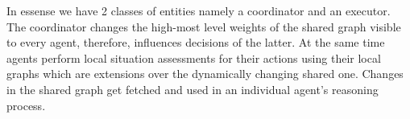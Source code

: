 In essense we have 2 classes of entities namely a coordinator and an executor. The coordinator changes the high-most
level weights of the shared graph visible to every agent, therefore, influences decisions of the latter. At the same
time agents perform local situation assessments for their actions using their local graphs which are extensions over the
dynamically changing shared one. Changes in the shared graph get fetched and used in an individual agent's reasoning
process.

